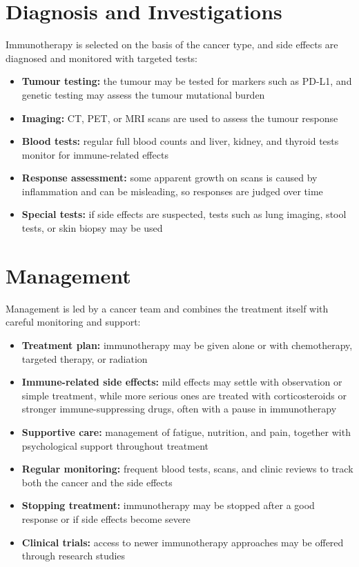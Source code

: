 \section*{Diagnosis and Investigations}
Immunotherapy is selected on the basis of the cancer type, and side effects are diagnosed and monitored with targeted tests:
\begin{itemize}
    \item \textbf{Tumour testing:} the tumour may be tested for markers such as PD-L1, and genetic testing may assess the tumour mutational burden
    \item \textbf{Imaging:} CT, PET, or MRI scans are used to assess the tumour response
    \item \textbf{Blood tests:} regular full blood counts and liver, kidney, and thyroid tests monitor for immune-related effects
    \item \textbf{Response assessment:} some apparent growth on scans is caused by inflammation and can be misleading, so responses are judged over time
    \item \textbf{Special tests:} if side effects are suspected, tests such as lung imaging, stool tests, or skin biopsy may be used
\end{itemize}

\section*{Management}
Management is led by a cancer team and combines the treatment itself with careful monitoring and support:
\begin{itemize}
    \item \textbf{Treatment plan:} immunotherapy may be given alone or with chemotherapy, targeted therapy, or radiation
    \item \textbf{Immune-related side effects:} mild effects may settle with observation or simple treatment, while more serious ones are treated with corticosteroids or stronger immune-suppressing drugs, often with a pause in immunotherapy
    \item \textbf{Supportive care:} management of fatigue, nutrition, and pain, together with psychological support throughout treatment
    \item \textbf{Regular monitoring:} frequent blood tests, scans, and clinic reviews to track both the cancer and the side effects
    \item \textbf{Stopping treatment:} immunotherapy may be stopped after a good response or if side effects become severe
    \item \textbf{Clinical trials:} access to newer immunotherapy approaches may be offered through research studies
\end{itemize}

